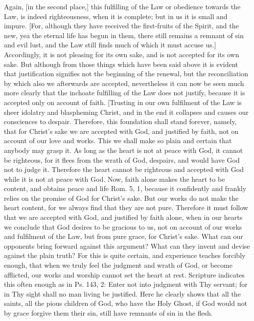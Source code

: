 Again, [in the second place,] this fulfilling of the Law or obedience
towards the Law, is indeed righteousness, when it is complete; but in
us it is small and impure.  [For, although they have received the
first-fruits of the Spirit, and the new, yea the eternal life has
begun in them, there still remains a remnant of sin and evil lust,
and the Law still finds much of which it must accuse us.] Accordingly,
it is not pleasing for its own sake, and is not accepted for its own
sake.  But although from those things which have been said above it
is evident that justification signifies not the beginning of the
renewal, but the reconciliation by which also we afterwards are
accepted, nevertheless it can now be seen much more clearly that the
inchoate fulfilling of the Law does not justify, because it is
accepted only on account of faith.  [Trusting in our own fulfilment
of the Law is sheer idolatry and blaspheming Christ, and in the end
it collapses and causes our consciences to despair.  Therefore, this
foundation shall stand forever, namely, that for Christ's sake we are
accepted with God, and justified by faith, not on account of our love
and works.  This we shall make so plain and certain that anybody may
grasp it.  As long as the heart is not at peace with God, it cannot
be righteous, for it flees from the wrath of God, despairs, and would
have God not to judge it.  Therefore the heart cannot be righteous
and accepted with God while it is not at peace with God.  Now, faith
alone makes the heart to be content, and obtains peace and life Rom.
5, 1, because it confidently and frankly relies on the promise of God
for Christ's sake.  But our works do not make the heart content, for
we always find that they are not pure.  Therefore it must follow that
we are accepted with God, and justified by faith alone, when in our
hearts we conclude that God desires to be gracious to us, not on
account of our works and fulfilment of the Law, but from pure grace,
for Christ's sake.  What can our opponents bring forward against this
argument?  What can they invent and devise against the plain truth?
For this is quite certain, and experience teaches forcibly enough,
that when we truly feel the judgment and wrath of God, or become
afflicted, our works and worship cannot set the heart at rest.
Scripture indicates this often enough as in Ps. 143, 2: Enter not
into judgment with Thy servant; for in Thy sight shall no man living
be justified.  Here he clearly shows that all the saints, all the
pious children of God, who have the Holy Ghost, if God would not by
grace forgive them their sin, still have remnants of sin in the flesh.
